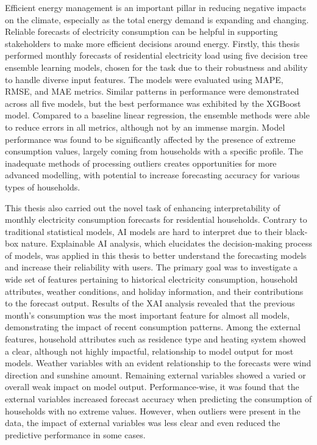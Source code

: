 Efficient energy management is an important pillar in reducing negative impacts on the climate, especially as the total energy demand is expanding and changing. Reliable forecasts of electricity consumption can be helpful in supporting stakeholders to make more efficient decisions around energy.  Firstly, this thesis performed monthly forecasts of residential electricity load using five decision tree ensemble learning models, chosen for the task due to their robustness and ability to handle diverse input features. The models were evaluated using MAPE, RMSE, and MAE metrics. Similar patterns in performance were demonstrated across all five models, but the best performance was exhibited by the XGBoost model. Compared to a baseline linear regression, the ensemble methods were able to reduce errors in all metrics, although not by an immense margin. Model performance was found to be significantly affected by the presence of extreme consumption values, largely coming from households with a specific profile. The inadequate methods of processing outliers creates opportunities for more advanced modelling, with potential to increase forecasting accuracy for various types of households.

This thesis also carried out the novel task of enhancing interpretability of monthly electricity consumption forecasts for residential households. Contrary to traditional statistical models, AI models are hard to interpret due to their black-box nature. Explainable AI analysis, which elucidates the decision-making process of models, was applied in this thesis to better understand the forecasting models and increase their reliability with users. The primary goal was to investigate a wide set of features pertaining to historical electricity consumption, household attributes, weather conditions, and holiday information, and their contributions to the forecast output. Results of the XAI analysis revealed that the previous month's consumption was the most important feature for almost all models, demonstrating the impact of recent consumption patterns. Among the external features, household attributes such as residence type and heating system showed a clear, although not highly impactful, relationship to model output for most models. Weather variables with an evident relationship to the forecasts were wind direction and sunshine amount. Remaining external variables showed a varied or overall weak impact on model output. Performance-wise, it was found that the external variables increased forecast accuracy when predicting the consumption of households with no extreme values. However, when outliers were present in the data, the impact of external variables was less clear and even reduced the predictive performance in some cases.

